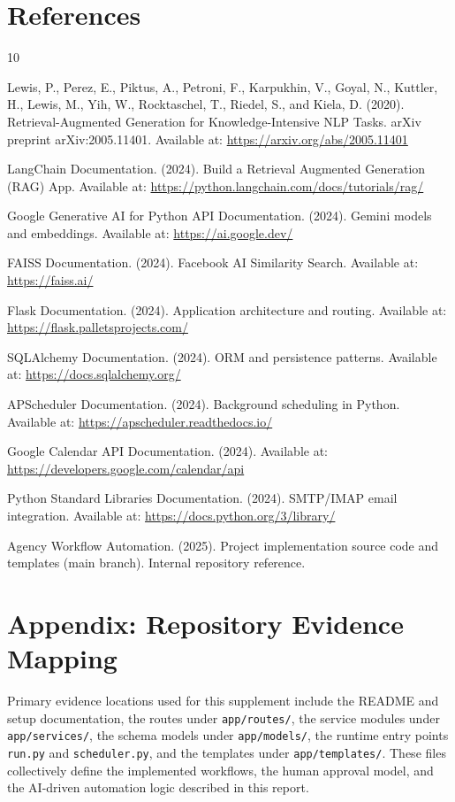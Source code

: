 \documentclass[12pt,a4paper]{report}
\begin{document}
\chapter*{References}
\begin{thebibliography}{10}

Lewis, P., Perez, E., Piktus, A., Petroni, F., Karpukhin, V., Goyal, N., Kuttler, H., Lewis, M., Yih, W., Rocktaschel, T., Riedel, S., and Kiela, D. (2020). Retrieval-Augmented Generation for Knowledge-Intensive NLP Tasks. arXiv preprint arXiv:2005.11401. Available at: \url{https://arxiv.org/abs/2005.11401}

LangChain Documentation. (2024). Build a Retrieval Augmented Generation (RAG) App. Available at: \url{https://python.langchain.com/docs/tutorials/rag/}

Google Generative AI for Python API Documentation. (2024). Gemini models and embeddings. Available at: \url{https://ai.google.dev/}

FAISS Documentation. (2024). Facebook AI Similarity Search. Available at: \url{https://faiss.ai/}

Flask Documentation. (2024). Application architecture and routing. Available at: \url{https://flask.palletsprojects.com/}

SQLAlchemy Documentation. (2024). ORM and persistence patterns. Available at: \url{https://docs.sqlalchemy.org/}

APScheduler Documentation. (2024). Background scheduling in Python. Available at: \url{https://apscheduler.readthedocs.io/}

Google Calendar API Documentation. (2024). Available at: \url{https://developers.google.com/calendar/api}

Python Standard Libraries Documentation. (2024). SMTP/IMAP email integration. Available at: \url{https://docs.python.org/3/library/}

Agency Workflow Automation. (2025). Project implementation source code and templates (main branch). Internal repository reference.

\end{thebibliography}

\chapter*{Appendix: Repository Evidence Mapping}
Primary evidence locations used for this supplement include the README and setup documentation, the routes under \texttt{app/routes/}, the service modules under \texttt{app/services/}, the schema models under \texttt{app/models/}, the runtime entry points \texttt{run.py} and \texttt{scheduler.py}, and the templates under \texttt{app/templates/}. These files collectively define the implemented workflows, the human approval model, and the AI-driven automation logic described in this report.
\end{document}
